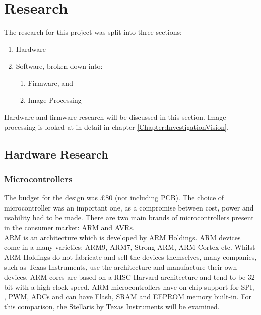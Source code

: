 \chapter{Research} \label{Chapter:Research}
The research for this project was split into three sections:
\begin{enumerate}
\item Hardware
\item Software, broken down into:
\begin{enumerate}
\item Firmware, and
\item Image Processing
\end{enumerate}
\end{enumerate}

Hardware and firmware research will be discussed in this section. Image processing is looked at in detail in chapter \ref{Chapter:InvestigationVision}.
\section{Hardware Research}\label{Research:Hardware}
\subsection{Microcontrollers}\label{Research:Microcontrollers}
The budget for the design was \pounds 80 (not including PCB). The choice of microcontroller was an important one, as a compromise between cost, power and usability had to be made. There are two main brands of microcontrollers present in the consumer market: ARM and AVRs.\\ %

ARM is an architecture which is developed by ARM Holdings. ARM devices come in a many varieties: ARM9, ARM7, Strong ARM, ARM Cortex etc. Whilst ARM Holdings do not fabricate and sell the devices themselves, many companies, such as Texas Instruments, use the architecture and manufacture their own devices. ARM cores are based on a RISC Harvard architecture and tend to be 32-bit with a high clock speed. ARM microcontrollers have on chip support for SPI, \itc, PWM, ADCs and can have Flash, SRAM and EEPROM memory built-in. For this comparison, the Stellaris by Texas Instruments will be examined. 


